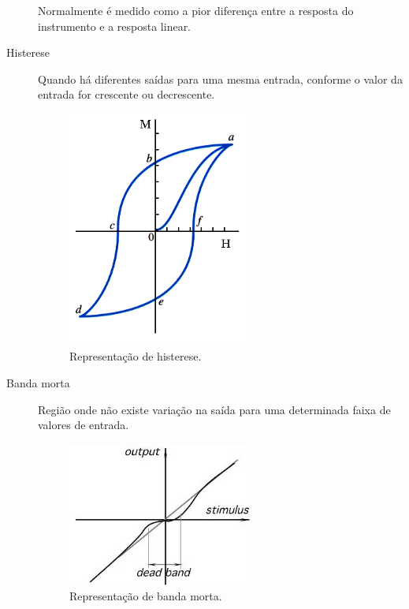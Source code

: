 \begin{description}
Normalmente é medido como a pior diferença entre a resposta do instrumento e a resposta linear.
\item[Histerese] Quando há diferentes saídas para uma mesma entrada,
conforme o valor da entrada for crescente ou decrescente.
\begin{figure}
  \includegraphics[width=0.6\textwidth]{figuras/histerese}
  \caption{Representação de histerese.}\label{fig:histerese}
\end{figure}
\item[Banda morta] Região onde não existe variação na saída para uma
determinada faixa de valores de entrada.
\begin{figure}
  \includegraphics[width=0.6\textwidth]{figuras/bandamorta}
  \caption{Representação de banda morta.}\label{fig:bandaMorta}
\end{figure}
\end{description}

